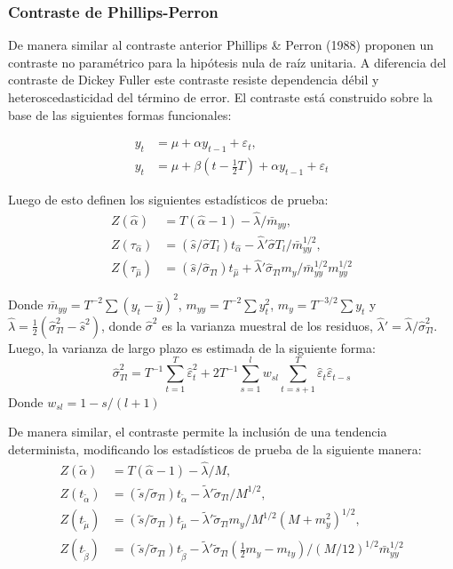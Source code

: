 \documentclass[12pt, twoside]{book}\usepackage[]{graphicx}\usepackage[]{color}
\numberwithin{equation}{section}
\numberwithin{theorem}{section}
\numberwithin{teorema}{section}
\numberwithin{defi}{section}
\numberwithin{prop}{section}
\numberwithin{defi}{section}
\theoremstyle{plain}
\begin{document}
\subsubsection{Contraste de Phillips-Perron}

De manera similar al contraste anterior Phillips \& Perron (1988) proponen un contraste no paramétrico para la hipótesis nula de raíz unitaria. A diferencia del contraste de Dickey Fuller este contraste resiste dependencia débil y heteroscedasticidad del término de error. El contraste está construido sobre la base de las siguientes formas funcionales: 

\begin{align}
y_{t} & = \mu+\alpha y_{t-1}+\varepsilon_{t}, \\ 
y_{t} & = \mu+\beta\left(t-\frac{1}{2}T\right)+\alpha y_{t-1}+\varepsilon_{t}
\end{align}

Luego de esto definen los siguientes estadísticos de prueba: 
\begin{align}
Z(\hat{\alpha}) & = T(\hat{\alpha}-1)-\hat{\lambda}/\bar{m}_{yy}, \label{eq:pp1}\\ 
Z(\tau_{\hat{\alpha}}) & = (\hat{s}/\hat{\sigma}T_{l})t_{\hat{\alpha}}-\hat{\lambda}'\hat{\sigma}T_{l}/\bar{m}^{1/2}_{yy}, \\ 
Z(\tau_{\hat{\mu}}) & = (\hat{s}/\hat{\sigma}_{Tl})t_{\hat{\mu}}+\hat{\lambda}'\hat{\sigma}_{Tl}m_{y}/\bar{m}^{1/2}_{yy}m^{1/2}_{yy} \label{eq:pp3}
\end{align}

Donde $\bar{m}_{yy}=T^{-2}\sum (y_{t}-\bar{y})^{2}$, $m_{yy}=T^{-2}\sum y_{t}^{2}$, $m_{y}=T^{-3/2}\sum y_{t}$ y $\hat{\lambda} = \frac{1}{2}(\hat{\sigma}^{2}_{Tl}-\hat{s} ^{2})$, donde $\hat{\sigma}^{2}$ es la varianza muestral de los residuos, $\hat{\lambda}'=\hat{\lambda}/\hat{\sigma}^{2}_{Tl}$. Luego, la varianza de largo plazo es estimada de la siguiente forma: 
\begin{equation}
\hat{\sigma}^{2}_{Tl}=T^{-1}\sum_{t=1}^{T}\hat{\varepsilon}_{t}^{2}+2T^{-1}\sum_{s=1}^{l}w_{sl}\sum_{t=s+1}^{T}\hat{\varepsilon}_{t}\hat{\varepsilon}_{t-s}
\end{equation}
Donde $w_{sl}=1-s/(l+1)$

De manera similar, el contraste permite la inclusión de una tendencia determinista, modificando los estadísticos de prueba de la siguiente manera: 
\begin{align}
Z(\tilde{\alpha})  & = T(\hat{\alpha}-1)-\hat{\lambda}/M, \\ 
Z(t_{\tilde{\alpha}}) & = (\tilde{s}/\tilde{\sigma}_{Tl})t_{\tilde{\alpha}}-\tilde{\lambda}'\tilde{\sigma}_{Tl}/M^{1/2}, \\ 
Z(t_{\tilde{\mu}}) & = (\tilde{s}/\tilde{\sigma}_{Tl})t_{\tilde{\mu}}-\tilde{\lambda}'\tilde{\sigma}_{Tl}m_{y}/M^{1/2}(M+m_{y}^{2})^{1/2}, \\
Z(t_{\tilde{\beta}}) & = (\tilde{s}/\tilde{\sigma}_{Tl})t_{\tilde{\beta}}-\tilde{\lambda}'\tilde{\sigma}_{Tl}\left(\frac{1}{2}m_{y}-m_{ty}\right)/(M/12)^{1/2}\bar{m}_{yy}^{1/2}
\end{align}
\end{document}
